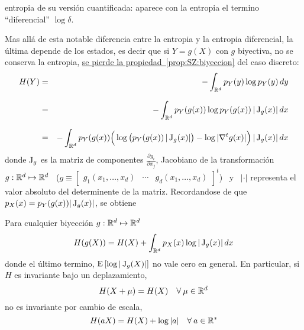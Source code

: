 entropia  de su  versi\'on  cuantificada:  aparece con  la  entropia el  termino
``diferencial'' $\log \delta$.
%
\begin{figure}[h!]
%
\begin{center}  \end{center}
%
%
\label{fig:SZ:CuantificacionX}
\end{figure}
%

Mas  all\'a  de  esta  notable  diferencia  entre  la  entropia  y  la  entropia
diferencial, la \'ultima depende de los estados,  es decir que si $Y = g(X)$ con
$g$  biyectiva,  no  se  conserva  la  entropia,  \ie  \underline{se  pierde  la
  propiedad~\ref{prop:SZ:biyeccion}}  del  caso discreto:
%
\begin{eqnarray*}
H(Y) & = & - \int_{\Rset^d} p_Y(y) \log p_Y(y) \, dy\\[2.5mm]
%
& = &  - \int_{\Rset^d} p_Y(g(x)) \log p_Y(g(x)) \, |\Jac_g(x)| \, dx\\[2.5mm]
%
& = & - \int_{\Rset^d} p_Y(g(x)) \Big( \log \big( p_Y(g(x)) \, |\Jac_g(x)| \big) -
\log |\nabla^t g(x)| \Big) \, |\Jac_g(x)| \, dx
\end{eqnarray*}
%
donde $\operatorname{J}_g$ es la  matriz de componentes $\frac{\partial g_i}{\partial x_j}$,
Jacobiano  de  la  transformaci\'on  \   $g:  \mathbb{R}^d  \mapsto  \mathbb{R}^d$  \  ($g
\equiv  \begin{bmatrix} g_1(x_1  ,  \ldots  , x_d)  &  \cdots &  g_d(x_1  , \ldots  ,
  x_d)  \end{bmatrix}^t$) \  y  \  $|\cdot|$ representa  el  valor absoluto  del
determinente   de  la  matriz.    Recordandose  de   que  $p_X(x)   =  p_Y(g(x))
|\operatorname{J}_g(x)|$, se obtiene
%
\begin{propiedadesC}\setcounter{enumi}{\value{PropBiyeccion}}
%
\item\label{prop:SZ:biyeccionC}
Para  cualquier biyecci\'on $g:  \mathbb{R}^d \mapsto  \mathbb{R}^d$
  \[
  H(g(X)) = H(X) + \int_{\mathbb{R}^d} p_X(x) \log |\operatorname{J}_g(x)| \, dx
  \]
  donde el \'ultimo termino, $\operatorname{E}\left[  \log |\operatorname{J}_g(X)| \right]$ no vale cero
  en    general.   En    particular,   si    $H$   es    invariante    bajo   un
  deplazamiento,
  \[
  H(X+\mu) = H(X) \quad \forall \: \mu \in \mathbb{R}^d
  \]
  no  es invariante  por cambio  de escala,
  \[
  H(a X) = H(X) + \log |a| \quad \forall \: a \in \mathbb{R}^*
  \]
\end{propiedadesC}
